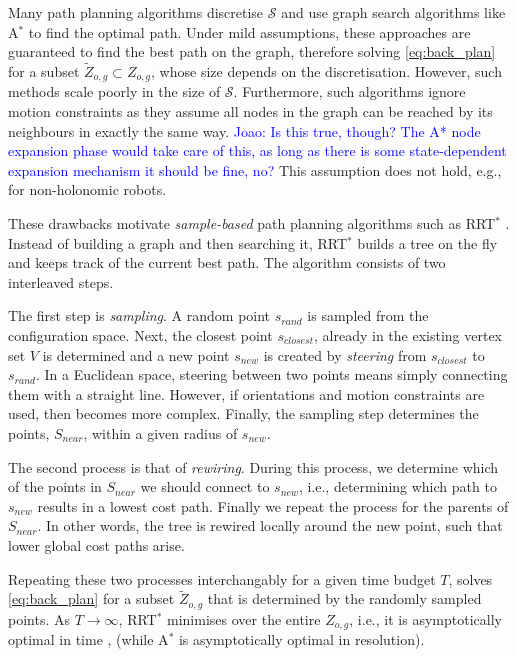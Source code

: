 \documentclass{article}  %
\newcommand{\jm}[1]{\textcolor{blue}{Joao: #1}}
\begin{document}
Many path planning algorithms discretise $\mathcal{S}$ and use graph search algorithms like A$^*$ to find the optimal path. Under mild assumptions, these approaches are guaranteed to find the best path on the graph, therefore solving \eqref{eq:back_plan} for a subset $\tilde{Z}_{o,g} \subset Z_{o,g}$, whose size depends on the discretisation. However, such methods scale poorly in the size of $\mathcal{S}$. Furthermore, such algorithms ignore motion constraints as they assume all nodes in the graph can be reached by its neighbours in exactly the same way. \jm{Is this true, though? The A* node expansion phase would take care of this, as long as there is some state-dependent expansion mechanism it should be fine, no?} This assumption does not hold, e.g., for non-holonomic robots.

These drawbacks motivate \emph{sample-based} path planning algorithms such as RRT$^*$  \cite{karaman2011sampling}. Instead of building a graph and then searching it, RRT$^*$ builds a tree on the fly and keeps track of the current best path. The algorithm consists of two interleaved steps. 

The first step is \emph{sampling}. A random point $s_{rand}$ is sampled from the configuration space. Next, the closest point $s_{closest}$, already in the existing vertex set $V$ is determined and a new point $s_{new}$ is created by \emph{steering} from  $s_{closest}$ to $s_{rand}$. In a Euclidean space, steering between two points means simply connecting them with a straight line. However, if orientations and motion constraints are used, then becomes more complex. Finally, the sampling step determines the points, $S_{near}$, within a given radius of $s_{new}$.

The second process is that of \emph{rewiring}. During this process, we determine which of the points in $S_{near}$ we should connect to $s_{new}$, i.e., determining which path to $s_{new}$ results in a lowest cost path. Finally we repeat the process for the parents of $S_{near}$. In other words, the tree is rewired locally around the new point, such that lower global cost paths arise.

Repeating these two processes interchangably for a given time budget $T$, solves \eqref{eq:back_plan} for a subset $\tilde{Z}_{o,g}$ that is determined by the randomly sampled points. As $T \rightarrow \infty$, RRT$^*$ minimises over the entire $Z_{o,g}$, i.e., it is asymptotically optimal in time \cite{karaman2011sampling}, (while A$^*$ is asymptotically optimal in resolution).
\end{document}
